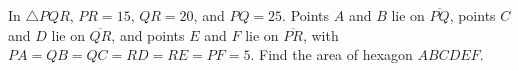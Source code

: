 In $\triangle PQR$, $PR=15$, $QR=20$, and $PQ=25$. Points $A$ and $B$ lie on $\overline{PQ}$, points $C$ and $D$ lie on $\overline{QR}$, and points $E$ and $F$ lie on $\overline{PR}$, with $PA=QB=QC=RD=RE=PF=5$. Find the area of hexagon $ABCDEF$.